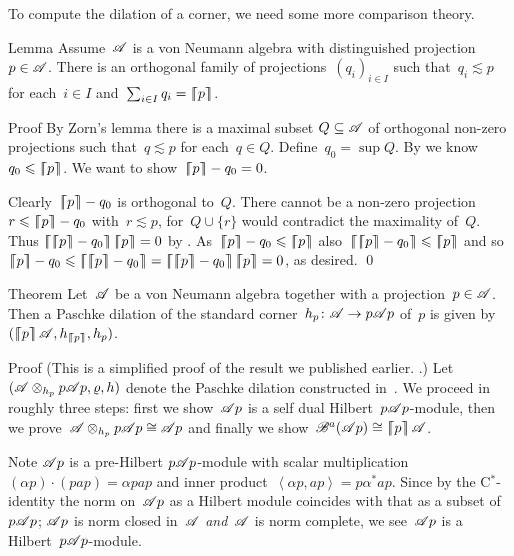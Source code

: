 \documentclass[b]{subfiles}
\begin{document}
\begin{parsec}%
\begin{point}%
To compute the dilation of a corner,
    we need some more comparison theory.
\end{point}
\begin{point}{Lemma}%
Assume~$\mathscr{A}$ is a von Neumann algebra with distinguished projection~$p \in \mathscr{A}$.
There is an orthogonal family of projections~$(q_i)_{i \in I}$
    such that~$q_i \lesssim p$ for each~$i \in I$
    and~$\sum_{i \in I} q_i = \left\lceil\!\!\left\lceil p\right\rceil\!\!\right\rceil$.
\begin{point}{Proof}%
By Zorn's lemma there is a maximal subset $Q \subseteq \mathscr{A}$ of orthogonal
    non-zero projections
    such that~$q \lesssim p$ for each~$q \in Q$.
Define~$q_0 = \sup Q$.
By 
    we know~$q_0 \leqslant \left\lceil\!\!\left\lceil p\right\rceil\!\!\right\rceil$.
We want to show~$\left\lceil\!\!\left\lceil p\right\rceil\!\!\right\rceil - q_0 = 0$.

Clearly~$\left\lceil\!\!\left\lceil p\right\rceil\!\!\right\rceil - q_0$ is orthogonal to~$Q$.
There cannot be a non-zero projection~$r \leqslant \left\lceil\!\!\left\lceil p\right\rceil\!\!\right\rceil - q_0$
    with~$r \lesssim p$,
    for~$Q \cup \{r \}$ would contradict the maximality of~$Q$.
Thus $\cceil{\cceil{p} - q_0} \cceil{p} = 0$
    by .
As~$\cceil{p} - q_0 \leq \cceil{p}$
    also~$\cceil{\cceil{p}-q_0} \leq \cceil{p}$
    and so~$ \cceil{p} - q_0 \leq \cceil{\cceil{p} - q_0}
                = \cceil{\cceil{p}-q_0}\cceil{p} = 0$, as desired. \qed
\end{point}
\end{point}
\begin{point}{Theorem}%
Let~$\mathscr{A}$ be a von Neumann algebra together with a projection~$p \in \mathscr{A}$.
Then a Paschke dilation of the standard corner~$h_p \colon \mathscr{A} \to p\mathscr{A} p$
of~$p$ is given by~$(\cceil{p}\scrA, h_{\cceil{p}}, h_p)$.
\begin{point}{Proof}%
(This is a simplified proof of the result we published earlier.
    \cite[Thm.~28]{wwpaschke}.)
Let~$(\mathscr{A} \otimes_{h_p} p\mathscr{A} p, \varrho, h)$
    denote the Paschke dilation constructed in~.
We proceed in roughly three steps:
    first we show~$\mathscr{A} p$ is a self dual Hilbert~$p\mathscr{A} p$-module,
    then we prove~$\mathscr{A} \otimes_{h_p} p\mathscr{A} p \cong \mathscr{A} p$
    and finally we show~$\mathscr{B}^a(\mathscr{A} p) \cong \left\lceil\!\!\left\lceil p\right\rceil\!\!\right\rceil \mathscr{A}$.
\begin{point}%
Note $\mathscr{A} p$ is a pre-Hilbert $p \mathscr{A} p$-module
    with scalar multiplication~$(\alpha p)\cdot (pap) = \alpha pap$
    and inner product~$\left<\alpha p, ap\right> = p\alpha^*ap$.
Since by the C$^*$-identity the norm on~$\mathscr{A} p$
    as a Hilbert module coincides with that as a subset of~$p \mathscr{A} p$;
    $\mathscr{A} p$ is norm closed in~$\mathscr{A}$ \emph{and}~$\mathscr{A}$ is norm complete,
    we see~$\mathscr{A} p$ is a Hilbert~$p \mathscr{A} p$-module.


\end{point}
\end{point}
\end{point}
\end{parsec}
\end{document}
